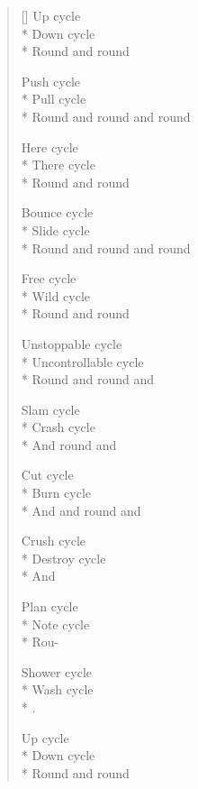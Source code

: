 \begin{verse}[\textwidth]
  Up cycle\\*
  Down cycle\\*
  Round and round

  Push cycle\\*
  Pull cycle\\*
  Round and round and round

  Here cycle\\*
  There cycle\\*
  Round and round

  Bounce cycle\\*
  Slide cycle\\*
  Round and round and round

  Free cycle\\*
  Wild cycle\\*
  Round and round

  Unstoppable cycle\\*
  Uncontrollable cycle\\*
  Round and round and

  Slam cycle\\*
  Crash cycle\\*
  And round and

  Cut cycle\\*
  Burn cycle\\*
  And and round and

  Crush cycle\\*
  Destroy cycle\\*
  And

  Plan cycle\\*
  Note cycle\\*
  Rou-

  Shower cycle\\*
  Wash cycle\\*
  .

  Up cycle\\*
  Down cycle\\*
  Round and round
\end{verse}

